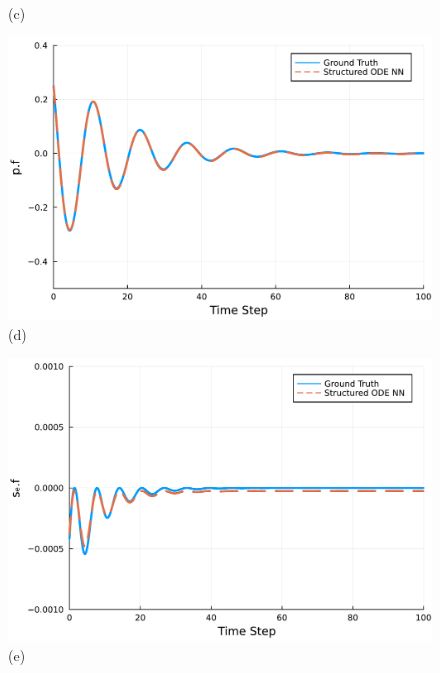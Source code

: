 \documentclass[
	parskip, 			   %
	twoside, 			   %
	DIV=14, 			   %
	BCOR=15.0mm, 		   %
	headsepline, 		   %
	open=right, 		   %
	captions=tableheading, %
	bibliography=totoc,    %
	numbers=noenddot       %
]{scrreprt}
\begin{document}
\begin{figure}[h!]
\begin{minipage}{.3\textwidth}
    \\(c)
    \end{minipage}
    \begin{minipage}{.3\textwidth}
    \centering
    \includegraphics[width=1\linewidth]{figures/p.f_compositional_idho_reuse.pdf}
    \\(d)
    \end{minipage}%
    \begin{minipage}{.3\textwidth}
    \centering
    \includegraphics[width=1\linewidth]{figures/se.f_compositional_idho_reuse.pdf}
    \\(e)
    \end{minipage}%
    \begin{minipage}{.3\textwidth}
    \centering

\end{minipage}
\end{figure}
\end{document}
